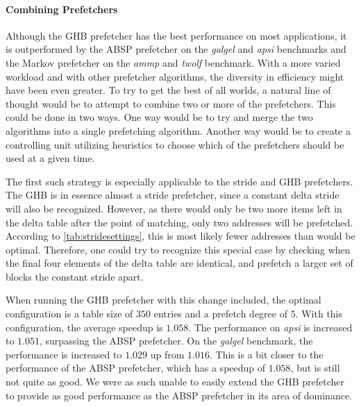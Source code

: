 \paragraph{Combining Prefetchers}
\label{par:prefcombo}
Although the GHB prefetcher has the best performance on most
applications, it is outperformed by the ABSP prefetcher on the
\emph{galgel} and \emph{apsi} benchmarks and the Markov prefetcher on
the \emph{ammp} and \emph{twolf} benchmark. With a more varied
workload and with other prefetcher algorithms, the diversity in
efficiency might have been even greater. To try to get the best of all
worlds, a natural line of thought would be to attempt to combine two
or more of the prefetchers. This could be done in two ways. One way
would be to try and merge the two algorithms into a single prefetching
algorithm. Another way would be to create a controlling unit utilizing
heuristics to choose which of the prefetchers should be used at a
given time.

The first such strategy is especially applicable to the stride and GHB
prefetchers. The GHB is in essence almost a stride prefetcher, since a
constant delta stride will also be recognized. However, as there would
only be two more items left in the delta table after the point of
matching, only two addresses will be prefetched. According to
\autoref{tab:stridesettings}, this is most likely fewer addresses than
would be optimal. Therefore, one could try to recognize this special
case by checking when the final four elements of the delta table are
identical, and prefetch a larger set of blocks the constant stride
apart.

When running the GHB prefetcher with this change included, the optimal
configuration is a table size of $350$ entries and a prefetch degree
of $5$. With this configuration, the average speedup is $1.058$. The
performance on \emph{apsi} is increased to $1.051$, surpassing the ABSP
prefetcher. On the \emph{galgel} benchmark, the performance is increased to
$1.029$ up from $1.016$. This is a bit closer to the performance of
the ABSP prefetcher, which has a speedup of $1.058$, but is still not
quite as good. We were as such unable to easily extend the GHB
prefetcher to provide as good performance as the ABSP prefetcher in
its area of dominance.
